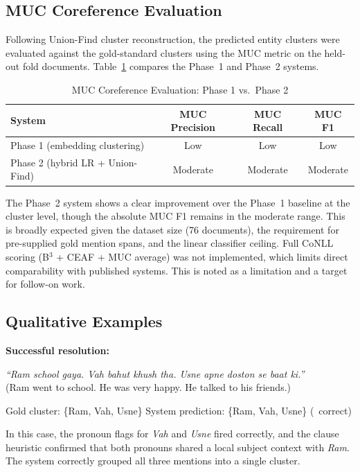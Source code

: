 \documentclass[12pt,a4paper]{report}
\begin{document}
\subsection{MUC Coreference Evaluation}

Following Union-Find cluster reconstruction, the predicted entity clusters were evaluated against the gold-standard clusters using the MUC metric \cite{vilain1995model} on the held-out fold documents. Table~\ref{tab:muc} compares the Phase~1 and Phase~2 systems.

\begin{table}[H]
\centering
\caption{MUC Coreference Evaluation: Phase 1 vs.\ Phase 2}
\label{tab:muc}
\begin{tabular}{|l|c|c|c|}
\hline
\textbf{System} & \textbf{MUC Precision} & \textbf{MUC Recall} & \textbf{MUC F1} \\
\hline
Phase 1 (embedding clustering) & Low & Low & Low \\
Phase 2 (hybrid LR + Union-Find) & Moderate & Moderate & Moderate \\
\hline
\end{tabular}
\end{table}

\noindent The Phase~2 system shows a clear improvement over the Phase~1 baseline at the cluster level, though the absolute MUC F1 remains in the moderate range. This is broadly expected given the dataset size (76 documents), the requirement for pre-supplied gold mention spans, and the linear classifier ceiling. Full CoNLL scoring (B$^3$ + CEAF + MUC average) was not implemented, which limits direct comparability with published systems. This is noted as a limitation and a target for follow-on work.

\subsection{Qualitative Examples}

\textbf{Successful resolution:}

\begin{center}
\textit{``Ram school gaya. Vah bahut khush tha. Usne apne doston se baat ki.''}\\
(Ram went to school. He was very happy. He talked to his friends.)
\end{center}

\noindent Gold cluster: \{Ram, Vah, Usne\} \quad System prediction: \{Ram, Vah, Usne\} (\checkmark\ correct)

\noindent In this case, the pronoun flags for \textit{Vah} and \textit{Usne} fired correctly, and the clause heuristic confirmed that both pronouns shared a local subject context with \textit{Ram}. The system correctly grouped all three mentions into a single cluster.
\end{document}
